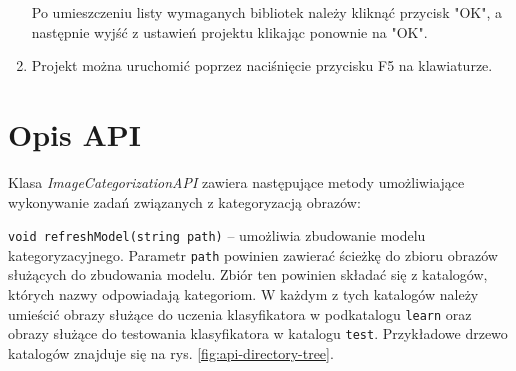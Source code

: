 \begin{enumerate}
	Po umieszczeniu listy wymaganych bibliotek należy kliknąć przycisk "OK", a następnie wyjść z ustawień projektu klikając ponownie na "OK".
	
	\item Projekt można uruchomić poprzez naciśnięcie przycisku F5 na klawiaturze.
\end{enumerate}

\section{Opis API}

Klasa \emph{ImageCategorizationAPI} zawiera następujące metody umożliwiające wykonywanie zadań związanych z kategoryzacją obrazów:

\begin{compactitem}
	\item \texttt{void refreshModel(string path)} -- umożliwia zbudowanie modelu kategoryzacyjnego. Parametr \texttt{path} powinien zawierać ścieżkę do zbioru obrazów służących do zbudowania modelu. Zbiór ten powinien składać się z katalogów, których nazwy odpowiadają kategoriom. W każdym z tych katalogów należy umieścić obrazy służące do uczenia klasyfikatora w podkatalogu \texttt{learn} oraz obrazy służące do testowania klasyfikatora w katalogu \texttt{test}. Przykładowe drzewo katalogów znajduje się na rys. \ref{fig:api-directory-tree}.
	

\end{compactitem}

